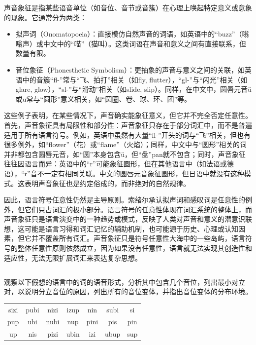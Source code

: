 \documentclass[10pt]{ctexart}
\begin{document}
声音象征是指某些语音单位（如音位、音节或音簇）在心理上唤起特定意义或意象的现象。它通常分为两类：
\begin{itemize}
    \item 拟声词（Onomatopoeia）：直接模仿自然声音的词语，如英语中的``buzz''（嗡嗡声）或中文中的``喵''（猫叫）。这类词语在声音和意义之间有直接联系，但数量有限。
    \item 音位象征（Phonesthetic Symbolism）：更抽象的声音与意义之间的关联，如英语中的音簇``fl-''常与``飞、拍打''相关（如fly, flutter），``gl-''与``闪光''相关（如glare, glow），``sl-''与``滑动''相关（如slide, slip）。同样，在中文中，圆唇元音ü或u常与``圆形''意义相关，如``圆圈、卷、球、环、团''等。
\end{itemize}

这些例子表明，在某些情况下，声音确实能象征意义，但它并不完全否定任意性。首先，声音象征具有局限性和部分性：声音象征只存在于部分词汇中，而不是普遍适用于所有语言符号。例如，英语中虽然有大量``fl-''开头的词与``飞''相关，但也有很多例外，如``flower''（花）或``flame''（火焰）；同样，中文中与``圆形''相关的词并非都包含圆唇元音，如``圆''本身包含ü，但``盘''pan就不包含；同时，声音象征往往因语言而异：英语中的``r''可能象征圆形，但在其他语言中（如法语或德语），``r''音不一定有相同关联。中文的圆唇元音象征圆形，但日语中就没有这种模式。这表明声音象征也是约定俗成的，而非绝对的自然规律。

因此，语言符号任意性仍然是主导原则。索绪尔承认拟声词和感叹词是任意性的例外，但它们只占词汇的极小部分。语言符号的任意性体现在词汇系统的整体上，而声音象征只是语言演变中的一种趋势或模式，反映了人类对声音和意义的潜意识联想，这可能是语言习得和词汇记忆的辅助机制，也可能源于历史、心理或认知因素，但它并不覆盖所有词汇。声音象征只是符号任意性大海中的一些岛屿，语言符号的整体任意性原则依然成立，因为如果没有任意性，语言就无法实现其创造性和适应性，无法无限扩展词汇来表达复杂思想。

\subsection{}
{\heiti
观察以下假想的语言中的词的语音形式，分析其中包含几个音位，列出最小对立对，以说明分立音位的原因，列出所有的音位变体，并指出音位变体的分布环境。

\begin{table}[H]
    \centering
    \begin{tabular}{ccccccc}
        sizi & pubi & nizi & izup & nin & subi & si \\
        pup & ubi & nubi & nup & pini & pis & pin \\ 
        up & nis & pizi & ubin & izi & ubup & sup \\
    \end{tabular}
\end{table}
}
\end{document}
